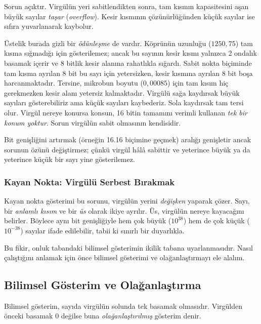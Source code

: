 Sorun açıktır. Virgülün yeri sabitlendikten sonra, tam kısmın kapasitesini aşan büyük sayılar \emph{taşar} (\emph{overflow}). Kesir kısmının çözünürlüğünden küçük sayılar ise sıfıra yuvarlanarak kaybolur.

Üstelik burada gizli bir \emph{ödünleşme} de vardır. Köprünün uzunluğu ($1250{,}75$) tam kısma sığmadığı için gösterilemez; ancak bu sayının kesir kısmı yalnızca 2 ondalık basamak içerir ve 8 bitlik kesir alanına rahatlıkla sığardı. Sabit nokta biçiminde tam kısma ayrılan 8 bit bu sayı için yetersizken, kesir kısmına ayrılan 8 bit boşa harcanmaktadır. Tersine, mikrobun boyutu ($0{,}00085$) için tam kısım hiç gerekmezken kesir alanı yetersiz kalmaktadır. Virgülü sağa kaydırsak büyük sayıları gösterebiliriz ama küçük sayıları kaybederiz. Sola kaydırsak tam tersi olur. Virgül nereye konursa konsun, 16 bitin tamamını verimli kullanan \emph{tek bir konum yoktur}. Sorun virgülün sabit olmasının kendisidir.

Bit genişliğini artırmak (örneğin 16.16 biçimine geçmek) aralığı genişletir ancak sorunun özünü değiştirmez; çünkü virgül hâlâ sabittir ve yeterince büyük ya da yeterince küçük bir sayı yine gösterilemez.

\subsubsection{Kayan Nokta: Virgülü Serbest Bırakmak}

Kayan nokta gösterimi bu sorunu, virgülün yerini \emph{değişken} yaparak çözer. Sayı, bir \emph{anlamlı kısım} ve bir \emph{üs} olarak ikiye ayrılır. Üs, virgülün nereye kayacağını belirler. Böylece aynı bit genişliğiyle hem çok büyük ($10^{38}$) hem de çok küçük ($10^{-38}$) sayılar ifade edilebilir, tabii ki sınırlı bir duyarlıkla.

Bu fikir, onluk tabandaki bilimsel gösterimin ikilik tabana uyarlanmasıdır. Nasıl çalıştığını anlamak için önce bilimsel gösterimi ve olağanlaştırmayı ele alalım.

\subsection{Bilimsel Gösterim ve Olağanlaştırma}

Bilimsel gösterim, sayıda virgülün solunda tek basamak olmasıdır. Virgülden önceki basamak 0 değilse buna \emph{olağanlaştırılmış} gösterim denir.

